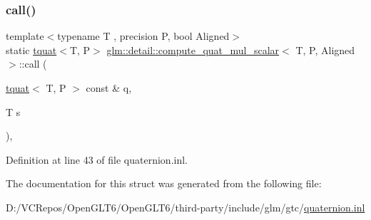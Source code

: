 \subsubsection{\texorpdfstring{call()}{call()}}
{\footnotesize\ttfamily template$<$typename T , precision P, bool Aligned$>$ \\
static \mbox{\hyperlink{structglm_1_1tquat}{tquat}}$<$T, P$>$ \mbox{\hyperlink{structglm_1_1detail_1_1compute__quat__mul__scalar}{glm\+::detail\+::compute\+\_\+quat\+\_\+mul\+\_\+scalar}}$<$ T, P, Aligned $>$\+::call (\begin{DoxyParamCaption}\item[{\mbox{\hyperlink{structglm_1_1tquat}{tquat}}$<$ T, P $>$ const \&}]{q,  }\item[{T}]{s }\end{DoxyParamCaption})\hspace{0.3cm}{\ttfamily [inline]}, {\ttfamily [static]}}



Definition at line 43 of file quaternion.\+inl.



The documentation for this struct was generated from the following file\+:\begin{DoxyCompactItemize}
\item 
D\+:/\+V\+C\+Repos/\+Open\+G\+L\+T6/\+Open\+G\+L\+T6/third-\/party/include/glm/gtc/\mbox{\hyperlink{gtc_2quaternion_8inl}{quaternion.\+inl}}\end{DoxyCompactItemize}
